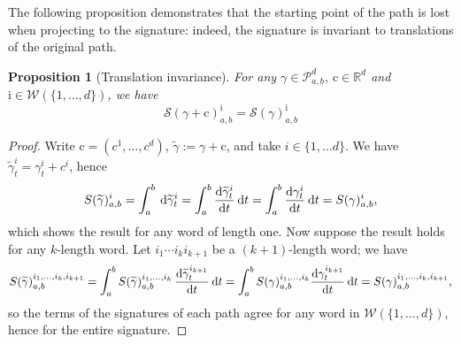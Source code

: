 \documentclass{amsart}[11pt]
\numberwithin{equation}{section}
\newtheorem{proposition}[theorem]{Proposition}
\theoremstyle{definition}
\newcommand{\diff}[1]{\hspace{0.2em} \D #1}
\newcommand{\Pp}{\mathcal{P}}
\newcommand{\ii}{\boldsymbol{\mathrm{i}}}
\newcommand{\cc}{\mathrm{c}}
\newcommand{\Ww}{\mathcal{W}}
\newcommand{\Ss}{\mathcal{S}}
\newcommand{\RR}{\mathbb{R}}
\newcommand{\D}{\mathrm{d}}
\newcommand{\Pab}{\Pp_{a,b}^{d}}
\begin{document}
The following proposition demonstrates that the starting point of the path is lost when projecting to the signature: indeed, the signature is invariant to translations of the original path.

\begin{proposition}[Translation invariance]
\label{prop:translation-invariance-of-path-signature}
For any $\gamma\in\Pab$, $\cc\in \RR^d$ and $\ii \in \Ww(\{1, \ldots, d\})$, we have
$$\Ss(\gamma + \cc)^{\ii}_{a, b} = \Ss(\gamma)^{\ii}_{a, b}$$
\end{proposition}

\begin{proof}
    Write $\cc = (c^1, \ldots, c^d)$, $\widetilde{\gamma} := \gamma + \cc$, and take $i \in \{1, \ldots d\}$. We have $\widetilde{\gamma}^i_t = \gamma^i_t + c^i$, 
hence 
    \begin{equation*}
        S(\widetilde{\gamma})^{i}_{a, b} = \int_a^b \diff{\widetilde{\gamma}_t^i} = \int_a^b \frac{\D \widetilde{\gamma}_t^i}{\D t} \diff{t}
 = \int_a^b \frac{\D \gamma_t^i}{\D t} \diff{t} = S(\gamma)^i_{a,b},
    \end{equation*}
    which shows the result for any word of length one. Now suppose the result holds for any $k$-length word. Let $i_1 \cdots i_k i_{k+1}$ be a $(k+1)$-length word; we have
    \begin{equation*}
        S(\widetilde{\gamma})^{i_1, \ldots, i_k, i_{k+1}}_{a,b} = \int_a^b S(\widetilde{\gamma})_{a, b}^{i_1, \ldots, i_k} \hspace{0.2em} \frac{\D \widetilde{\gamma}^{i_{k+1}}_t}{\D t} \diff{t} = \int_a^b S(\gamma)_{a, b}^{i_1, \ldots, i_k} \frac{\D \gamma_t^{i_{k+1}}}{\D t} \diff{t} = S(\gamma)_{a,b}^{i_1, \ldots, i_k, i_{k+1}},
    \end{equation*}
so the terms of the signatures of each path agree for any word in $\mathcal{W}(\{1, \ldots, d\})$, 
hence for the entire signature.
\end{proof}

\end{document}
